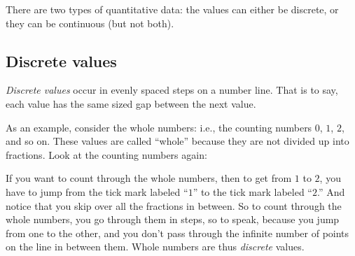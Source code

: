 \documentclass[../../../main.tex]{subfiles}
\begin{document}
There are two types of quantitative data: the values can either be discrete, or they can be continuous (but not both).


\subsection{Discrete values}

\emph{Discrete values} occur in evenly spaced steps on a number line. That is to say, each value has the same sized gap between the next value. 

As an example, consider the whole numbers: i.e., the counting numbers $0$, $1$, $2$, and so on. These values are called ``whole'' because they are not divided up into fractions. Look at the counting numbers again:
  
  \begin{center}
  \end{center}
  
If you want to count through the whole numbers, then to get from $1$ to $2$, you have to jump from the tick mark labeled ``$1$'' to the tick mark labeled ``$2$.'' And notice that you skip over all the fractions in between. So to count through the whole numbers, you go through them in steps, so to speak, because you jump from one to the other, and you don't pass through the infinite number of points on the line in between them. Whole numbers are thus \emph{discrete} values. 
\end{document}
